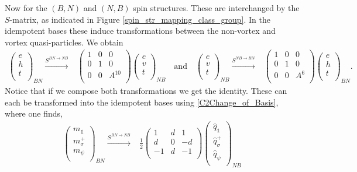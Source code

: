\documentclass[12pt,a4paper]{article}
\newcounter{arrow}
\newcommand{\unit}{\mathds{1}}
\begin{document}
Now for the $(B,N)$ and $(N,B)$ spin structures.
These are interchanged by the $S$-matrix, as indicated in Figure \ref{spin_str_mapping_class_group}.
In the idempotent bases these induce transformations between the non-vortex and vortex quasi-particles.
We obtain 
\begin{align}
\left( \begin{matrix}
e\\
h\\
t\\
\end{matrix} \right)_{BN} 
\xrightarrow{S^{BN \rightarrow NB}} & \left( \begin{matrix}
1&0&0\\
0&1&0\\
0&0&A^{10}\\
\end{matrix} \right)
\left( \begin{matrix}
e\\
v\\
t\\
\end{matrix} \right)_{NB}
\quad \text{and} \quad 
\left( \begin{matrix}
e\\
v\\
t\\
\end{matrix} \right)_{NB} 
\xrightarrow{S^{NB \rightarrow BN}} & \left( \begin{matrix}
1&0&0\\
0&1&0\\
0&0&A^{6}\\
\end{matrix} \right)
\left( \begin{matrix}
e\\
h\\
t\\
\end{matrix} \right)_{BN}.
\end{align}
Notice that if we compose both transformations we get the identity. 
These can each be transformed into the idempotent bases using \eqref{C2Change_of_Basis}, 
where one finds,
\begin{align}
\left( \begin{matrix}
m_\unit\\
m_\sigma^+\\
m_\psi\\
\end{matrix} \right)_{BN} 
\xrightarrow{S^{BN \rightarrow NB}} &\frac{1}{2} \left( \begin{matrix}
1&d&1\\
d&0&-d\\ %
-1&d&-1\\
\end{matrix} \right)
\left( \begin{matrix}
\hat{q}_\unit\\
\hat{q}_\sigma^+\\
\hat{q}_\psi\\
\end{matrix} \right)_{NB}
\end{align}
\end{document}

